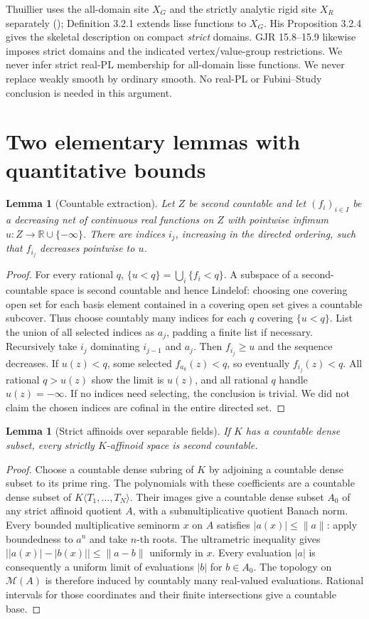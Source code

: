 \documentclass[11pt]{article}
\newtheorem{lemma}[theorem]{Lemma}
\theoremstyle{remark}
\begin{document}
Thuillier uses the all-domain site $X_G$ and the strictly analytic rigid
site $X_R$ separately (\cite[2.1.7]{Thu}); Definition 3.2.1 extends lisse
functions to $X_G$. His Proposition 3.2.4 gives the skeletal description
on compact \emph{strict} domains. GJR 15.8--15.9 likewise imposes strict
domains and the indicated vertex/value-group restrictions. We never infer
strict real-PL membership for all-domain lisse functions. We never replace
weakly smooth by ordinary smooth. No real-PL or Fubini--Study conclusion is
needed in this argument.

\section{Two elementary lemmas with quantitative bounds}
\begin{lemma}[Countable extraction]
Let $Z$ be second countable and let $(f_i)_{i\in I}$ be a decreasing net of
continuous real functions on $Z$ with pointwise infimum
$u:Z\to\mathbb R\cup\{-\infty\}$. There are indices $i_j$, increasing in
the directed ordering, such that $f_{i_j}$ decreases pointwise to $u$.
\end{lemma}
\begin{proof}
For every rational $q$, $\{u<q\}=\bigcup_i\{f_i<q\}$. A subspace of a
second-countable space is second countable and hence Lindelof: choosing one
covering open set for each basis element contained in a covering open set
gives a countable subcover. Thus choose countably many indices for each
$q$ covering $\{u<q\}$. List the union of all selected indices as $a_j$,
padding a finite list if necessary. Recursively take $i_j$ dominating
$i_{j-1}$ and $a_j$. Then $f_{i_j}\geq u$ and the sequence decreases.
If $u(z)<q$, some selected $f_{a_k}(z)<q$, so eventually
$f_{i_j}(z)<q$. All rational $q>u(z)$ show the limit is $u(z)$, and all
rational $q$ handle $u(z)=-\infty$. If no indices need selecting, the
conclusion is trivial. We did not claim the chosen indices are cofinal in
the entire directed set.
\end{proof}

\begin{lemma}[Strict affinoids over separable fields]
If $K$ has a countable dense subset, every strictly $K$-affinoid space is
second countable.
\end{lemma}
\begin{proof}
Choose a countable dense subring of $K$ by adjoining a countable dense
subset to its prime ring. The polynomials with these coefficients are a
countable dense subset of $K\langle T_1,\ldots,T_N\rangle$. Their images
give a countable dense subset $A_0$ of any strict affinoid quotient $A$,
with a submultiplicative quotient Banach norm. Every bounded multiplicative
seminorm $x$ on $A$ satisfies $|a(x)|\leq\|a\|$: apply boundedness to
$a^n$ and take $n$-th roots. The ultrametric inequality gives
$\bigl||a(x)|-|b(x)|\bigr|\leq\|a-b\|$ uniformly in $x$.
Every evaluation $|a|$ is consequently a uniform limit of evaluations
$|b|$ for $b\in A_0$. The topology on $\mathcal M(A)$ is therefore induced
by countably many real-valued evaluations. Rational intervals for those
coordinates and their finite intersections give a countable base.
\end{proof}
\end{document}
